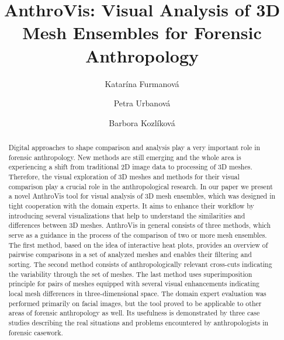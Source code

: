 \documentclass[final,5p,times]{elsarticle}
\begin{document}
\begin{frontmatter}


\title{AnthroVis: Visual Analysis of 3D Mesh Ensembles for Forensic Anthropology}

\author[fi]{Katar\'{i}na Furmanov\'{a}}
\author[ant]{Petra Urbanov\'{a}} 
\author[fi]{Barbora Kozl\'{i}kov\'{a}}
\address[fi]{Faculty of Informatics, Masaryk University, Brno, Czech Republic}
\address[ant]{Faculty of Science, Masaryk University, Brno, Czech Republic}


\begin{abstract}
Digital approaches to shape comparison and analysis play a very important role in forensic anthropology. New methods are still emerging and the whole area is experiencing a shift from traditional 2D image data to processing of 3D meshes. Therefore, the visual exploration of 3D meshes and methods for their visual comparison play a crucial role in the anthropological research. In our paper we present a novel AnthroVis tool for visual analysis of 3D mesh ensembles, which was designed in tight cooperation with the domain experts. It aims to enhance their workflow by introducing several visualizations that help to understand the similarities and differences between 3D meshes. AnthroVis in general consists of three methods, which serve as a guidance in the process of the comparison of two or more mesh ensembles. The first method, based on the idea of interactive heat plots, provides an overview of pairwise comparisons in a set of analyzed meshes and enables their filtering and sorting. The second method consists of anthropologically relevant cross-cuts indicating the variability through the set of meshes. The last method uses superimposition principle for pairs of meshes equipped with several visual enhancements indicating local mesh differences in three-dimensional space. The domain expert evaluation was performed primarily on facial images, but the tool proved to be applicable to other areas of forensic anthropology as well. Its usefulness is demonstrated by three case studies describing the real situations and problems encountered by anthropologists in forensic casework.
\end{abstract}



\end{frontmatter}
\end{document}
